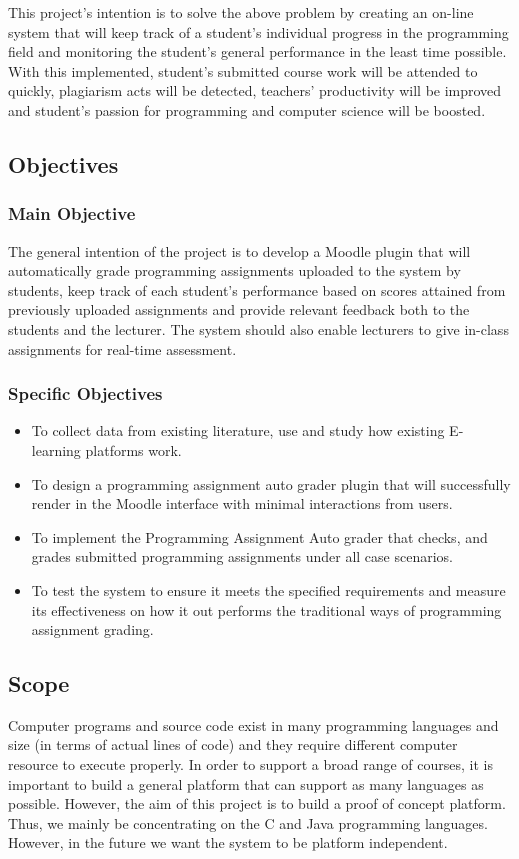 \documentclass[12pt]{article}
\begin{document}
		\noindent This project's intention is to solve the above problem by creating an on-line system that will keep track of a student's individual progress in the programming field and monitoring the student's general performance in the least time possible. With this implemented, student's submitted course work will be attended to quickly, plagiarism acts will be detected, teachers' productivity will be improved and student's passion for programming and computer science will be boosted.
	\subsection{Objectives}
		\subsubsection{Main Objective}
		The general intention of the project is to develop a Moodle plugin that will automatically grade programming assignments uploaded to the system by students, keep track of each student’s performance based on scores attained from previously uploaded assignments and provide relevant feedback both to the students and the lecturer. The system should also enable lecturers to give in-class assignments for real-time assessment.
		\subsubsection{Specific Objectives}
		\begin{itemize}
			\item To collect data from existing literature, use and study how existing E-learning platforms work.
			\item To design a programming assignment auto grader plugin that will successfully render in the Moodle interface with minimal interactions from users.
			\item To implement the Programming Assignment Auto grader that checks, and grades submitted programming assignments under all case scenarios. 
			\item To test the system to ensure it meets the specified requirements and measure its effectiveness on how it out performs the traditional ways of programming assignment grading.
		\end{itemize}
		
	\subsection{Scope}
		Computer programs and source code exist in many programming languages and size (in terms of actual lines of code) and they require different computer resource to execute properly. In order to support a broad range of courses, it is important to build a general platform that can support as many languages as possible. However, the aim of this project is to build a proof of concept platform. Thus, we mainly be concentrating on the C and Java programming languages.
		However, in the future we want the system to be platform independent. \\
		 
\end{document}
